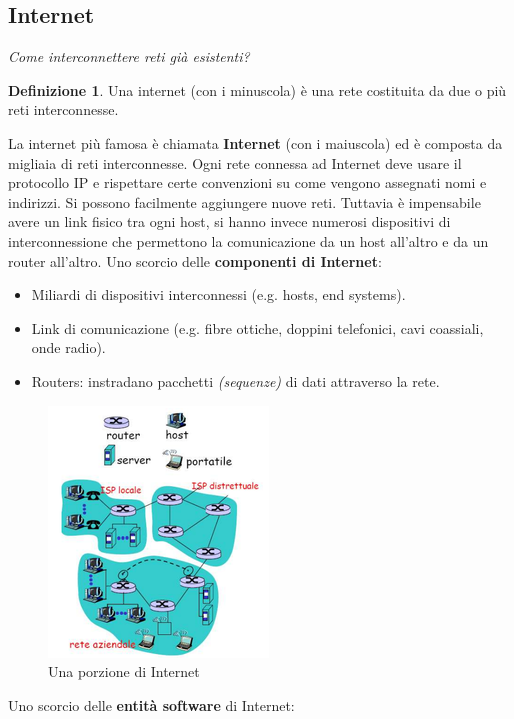 \documentclass[11pt,a4paper]{article}
\theoremstyle{definition}
\newtheorem{definition}{Definizione}[section]
\begin{document}
\subsection{Internet}
\textit{Come interconnettere reti già esistenti?}\newline
\theoremstyle{definition}
\begin{definition}
	Una internet (con i minuscola) è una rete costituita da
	due o più reti interconnesse.
\end{definition}
La internet più famosa è chiamata \textbf{Internet} (con i maiuscola) ed è composta da migliaia di reti interconnesse. Ogni rete connessa ad Internet deve usare il protocollo IP e rispettare certe convenzioni su come vengono assegnati nomi e indirizzi.
Si possono facilmente aggiungere nuove reti. \newline Tuttavia è impensabile avere un link fisico tra ogni host, si hanno invece numerosi
dispositivi di interconnessione che permettono la comunicazione da un host all'altro e da un router all'altro.\newline
Uno scorcio delle \textbf{componenti di Internet}:
\begin{itemize}
	\item Miliardi di dispositivi interconnessi (e.g. hosts, end systems).
	\item Link di comunicazione (e.g. fibre ottiche, doppini telefonici,
	      cavi coassiali, onde radio).
	\item Routers: instradano pacchetti \textit{(sequenze)} di dati attraverso la rete.
\end{itemize}

\begin{figure}[!h]
	\includegraphics[scale=0.7]{Immagini/Internet.png}
	\centering
	\caption{Una porzione di Internet}
\end{figure}

Uno scorcio delle \textbf{entità software} di Internet:
\end{document}
